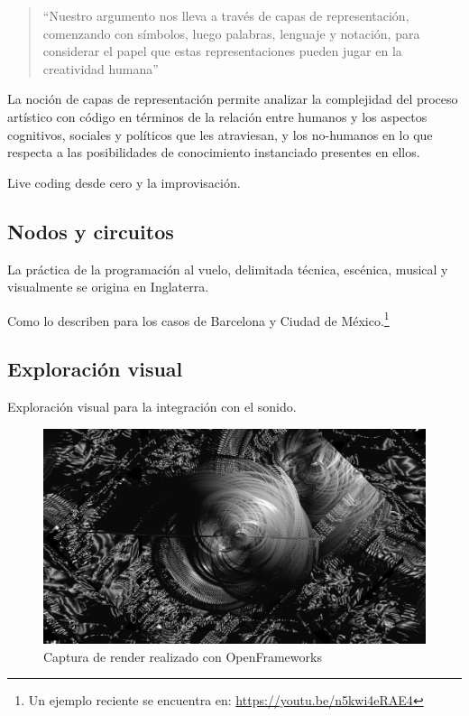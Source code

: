 \begin{quote}

  ``Nuestro argumento nos lleva a través de capas de representación, comenzando con símbolos, luego palabras, lenguaje y notación, para considerar el papel que estas representaciones pueden jugar en la creatividad humana'' \citep[p.~3]{McLean2011}

\end{quote}

  
La noción de capas de representación permite analizar la complejidad del proceso artístico con código en términos de la relación entre humanos y los aspectos cognitivos, sociales y políticos que les atraviesan, y los no-humanos en lo que respecta a las posibilidades de conocimiento instanciado presentes en ellos. 

Live coding desde cero y la improvisación. 

\subsection{Nodos y circuitos}

La práctica de la programación al vuelo, delimitada técnica, escénica, musical y visualmente se origina en Inglaterra. %

Como lo describen \cite{villasenor} para los casos de Barcelona y Ciudad de México.\footnote{Un ejemplo reciente se encuentra en: \url{https://youtu.be/n5kwi4eRAE4}} 

\subsection{Exploración visual}

Exploración visual para la integración con el sonido.  

\begin{figure}[tb]
\centering 
\includegraphics[width=\columnwidth]{../../img/of13.png} 
\caption[Openframeworks 1]{Captura de render realizado con OpenFrameworks} %
\label{fig:gallery} 
\end{figure}

